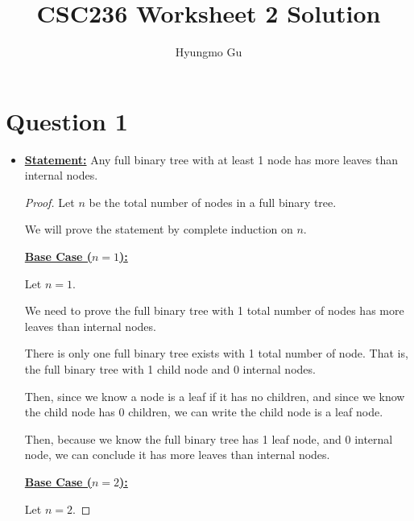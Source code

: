 \documentclass[12pt]{article}
\begin{document}
\title{CSC236 Worksheet 2 Solution}
\author{Hyungmo Gu}
\maketitle

\section*{Question 1}
\begin{itemize}
    \item

    \bigskip

    \underline{\textbf{Statement:}} Any full binary tree with at least 1 node has
    more leaves than internal nodes.

    \bigskip

    \begin{proof}
    Let $n$ be the total number of nodes in a full binary tree.

    \bigskip

    We will prove the statement by complete induction on $n$.

    \bigskip

    \underline{\textbf{Base Case ($n = 1$):}}

    \bigskip

    Let $n = 1$.

    \bigskip

    We need to prove the full binary tree with 1 total number of nodes
    has more leaves than internal nodes.

    \bigskip

    There is only one full binary tree exists with 1 total number of node. That is,
    the full binary tree with 1 child node and 0 internal nodes.

    \bigskip

    Then, since we know a node is a leaf if it has no children, and since we know
    the child node has 0 children, we can write the child node is a leaf node.

    \bigskip

    Then, because we know the full binary tree has 1 leaf node, and 0 internal node,
    we can conclude it has more leaves than internal nodes.

    \bigskip

    \underline{\textbf{Base Case ($n = 2$):}}

    \bigskip

    Let $n = 2$.


\end{proof}
\end{itemize}
\end{document}
